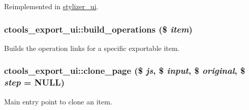 Reimplemented in \hyperlink{classstylizer__ui_ae2cd136304d22ed167dcb660f03b2bbf}{stylizer\_\-ui}.\hypertarget{classctools__export__ui_adb903ed8cca456e7ca48bf91fffff481}{
\subsubsection[{build\_\-operations}]{\setlength{\rightskip}{0pt plus 5cm}ctools\_\-export\_\-ui::build\_\-operations (\$ {\em item})}}
\label{classctools__export__ui_adb903ed8cca456e7ca48bf91fffff481}
Builds the operation links for a specific exportable item. \hypertarget{classctools__export__ui_a20bcb4d94dd7450de286084cd3dd6e99}{
\subsubsection[{clone\_\-page}]{\setlength{\rightskip}{0pt plus 5cm}ctools\_\-export\_\-ui::clone\_\-page (\$ {\em js}, \/  \$ {\em input}, \/  \$ {\em original}, \/  \$ {\em step} = {\ttfamily NULL})}}
\label{classctools__export__ui_a20bcb4d94dd7450de286084cd3dd6e99}
Main entry point to clone an item. 

